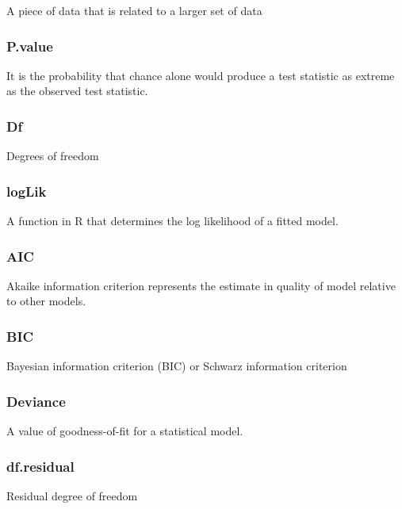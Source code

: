 \documentclass[10pt,letterpaper]{article}
\begin{document}
A piece of data that is related to a larger set of data

\hypertarget{p.value}{%
\subsubsection{P.value}\label{p.value}}

It is the probability that chance alone would produce a test statistic
as extreme as the observed test statistic.

\hypertarget{df}{%
\subsubsection{Df}\label{df}}

Degrees of freedom

\hypertarget{loglik}{%
\subsubsection{logLik}\label{loglik}}

A function in R that determines the log likelihood of a fitted model.

\hypertarget{aic}{%
\subsubsection{AIC}\label{aic}}

Akaike information criterion represents the estimate in quality of model
relative to other models.

\hypertarget{bic}{%
\subsubsection{BIC}\label{bic}}

Bayesian information criterion (BIC) or Schwarz information criterion

\hypertarget{deviance}{%
\subsubsection{Deviance}\label{deviance}}

A value of goodness-of-fit for a statistical model.

\hypertarget{df.residual}{%
\subsubsection{df.residual}\label{df.residual}}

Residual degree of freedom
\end{document}
